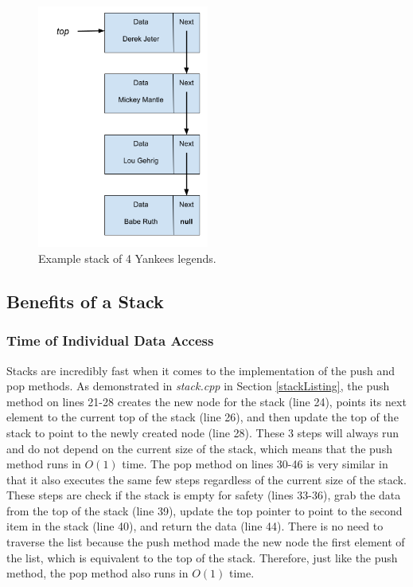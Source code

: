\documentclass[letterpaper, 10pt,DIV=13]{scrartcl}
\numberwithin{equation}{section} %
\numberwithin{figure}{section} %
\numberwithin{table}{section} %
\begin{document}
\begin{figure}[ht] 
    \centering 
    \includegraphics[height=8cm]{stack}
    \caption{Example stack of 4 Yankees legends.}
    \label{figure:stack}
 \end{figure}

\subsection{Benefits of a Stack}
\subsubsection{Time of Individual Data Access}
Stacks are incredibly fast when it comes to the implementation of the push and pop methods. As demonstrated in \textit{stack.cpp} in Section \ref{stackListing},
the push method on lines 21-28 creates the new node for the stack (line 24), points its next element to the current top of the stack (line 26), and then update the top of the stack to
point to the newly created node (line 28). These 3 steps will always run and do not depend on the current size of the stack, which means that the push method runs in $O(1)$ time.
The pop method on lines 30-46 is very similar in that it also executes the same few steps regardless of the current size of the stack. These steps are check if the stack is empty for safety (lines 33-36),
grab the data from the top of the stack (line 39), update the top pointer to point to the second item in the stack (line 40), and return the data (line 44). There is no need to traverse the list because the push
method made the new node the first element of the list, which is equivalent to the top of the stack. Therefore, just like the push method, the pop method also runs in $O(1)$ time.
\end{document}
